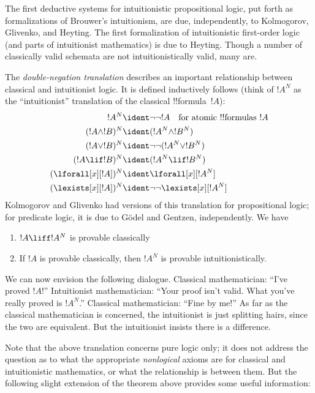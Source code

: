 \documentclass[../../../include/open-logic-section]{subfiles}
\begin{document}
The first deductive systems for intuitionistic propositional
logic, put forth as formalizations of Brouwer's intuitionism, are due,
independently, to Kolmogorov, Glivenko, and Heyting. The first
formalization of intuitionistic first-order logic (and parts of
intuitionist mathematics) is due to Heyting. Though a number of
classically valid schemata are not intuitionistically valid, many are.

The \emph{double-negation translation} describes an important
relationship between classical and intuitionist logic. It is defined
inductively follows (think of $!A^N$ as the ``intuitionist''
translation of the classical !!{formula}~$!A$):
\begin{align*}
!A^N & \ident \lnot\lnot !A \quad \text{for atomic !!{formula}s $!A$} \\
(!A \land !B)^N & \ident (!A^N \land !B^N) \\
(!A \lor !B)^N & \ident  \lnot\lnot (!A^N \lor !B^N) \\
(!A \lif !B)^N & \ident (!A^N \lif !B^N) \\
(\lforall[x][!A])^N & \ident \lforall[x][!A^N] \\
(\lexists[x][!A])^N & \ident \lnot\lnot\lexists[x][!A^N]
\end{align*}
Kolmogorov and Glivenko had versions of this translation for
propositional logic; for predicate logic, it is due to G\"odel and
Gentzen, independently. We have

\begin{thm}
\begin{enumerate}
\item $!A \liff !A^N$ is provable classically
\item If $!A$ is provable classically, then $!A^N$ is provable
  intuitionistically.
\end{enumerate}
\end{thm}

We can now envision the following dialogue. Classical mathematician:
``I've proved $!A$!'' Intuitionist mathematician: ``Your proof isn't
valid. What you've really proved is $!A^N$.'' Classical mathematician:
``Fine by me!'' As far as the classical mathematician is concerned, the
intuitionist is just splitting hairs, since the two are
equivalent. But the intuitionist insists there is a difference.

Note that the above translation concerns pure logic only; it does not
address the question as to what the appropriate \emph{nonlogical}
axioms are for classical and intuitionistic mathematics, or what the
relationship is between them. But the following slight extension of
the theorem above provides some useful information:
\end{document}
